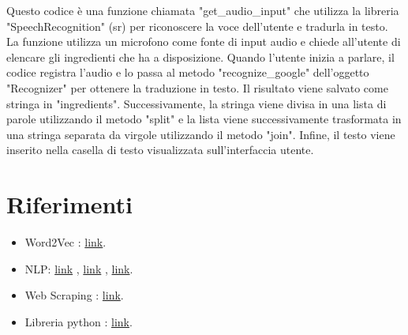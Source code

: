 \documentclass[12pt]{report}
\begin{document}
Questo codice è una funzione chiamata "get\_audio\_input" che utilizza la libreria "SpeechRecognition" (sr) per riconoscere la voce dell'utente e tradurla in testo. La funzione utilizza un microfono come fonte di input audio e chiede all'utente di elencare gli ingredienti che ha a disposizione. Quando l'utente inizia a parlare, il codice registra l'audio e lo passa al metodo "recognize\_google" dell'oggetto "Recognizer" per ottenere la traduzione in testo. Il risultato viene salvato come stringa in "ingredients". Successivamente, la stringa viene divisa in una lista di parole utilizzando il metodo "split" e la lista viene successivamente trasformata in una stringa separata da virgole utilizzando il metodo "join". Infine, il testo viene inserito nella casella di testo visualizzata sull'interfaccia utente.

\chapter{Riferimenti}
\begin{itemize}
\item Word2Vec  : \href{http://nadbordrozd.github.io/blog/2016/05/20/text-classification-with-word2vec/}{link}.
\item NLP: \href{https://towardsdatascience.com/nlp-performance-of-different-word-embeddings-on-text-classification-de648c6262b}{link} , \href{https://github.com/TomLin/Playground/blob/master/04-Model-Comparison-Word2vec-Doc2vec-TfIdfWeighted.ipynb}{link} , 
\href{https://towardsdatascience.com/an-introduction-to-word2vec-in-nlp-854e1c288894}{link}.
\item Web Scraping : \href{https://realpython.com/beautiful-soup-web-scraper-python/}{link}.
\item Libreria python : \href{ https://github.com/hhursev/recipe-scrapers}{link}.
\end{itemize}
\end{document}
